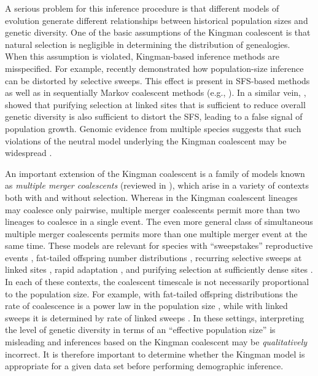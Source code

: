\documentclass[11pt, letterpaper]{article}   	%
\begin{document}
A serious problem for this inference procedure is that different models of evolution generate different relationships between historical population sizes and genetic diversity.
One of the basic assumptions of the Kingman coalescent is that natural selection is negligible in determining the distribution of genealogies.
When this assumption is violated, Kingman-based inference methods are misspecified.
For example, \cite{SchriderEtAl2016} recently demonstrated how population-size inference can be distorted by selective sweeps.
This effect is present in SFS-based methods as well as in sequentially Markov coalescent methods (e.g., \cite{LiDurbin2011}).
In a similar vein, \cite{CvijovicEtAl2018}, showed that purifying selection at linked sites that is sufficient to reduce overall genetic diversity is also sufficient to distort the SFS, leading to a false signal of population growth.
Genomic evidence from multiple species suggests that such violations of the neutral model underlying the Kingman coalescent may be widespread \autocite{SellaEtAl2009, Corbett-DetigEtAl2015, KernHahn2018}.

An important extension of the Kingman coalescent is a family of models known as \textit{multiple merger coalescents} \autocite{Pitman1999, Sagitov1999, DonnellyKurtz1999,} (reviewed in \cite{Eldon2016}), which arise in a variety of contexts both with and without selection.
Whereas in the Kingman coalescent lineages may coalesce only pairwise, multiple merger coalescents permit more than two lineages to coalesce in a single event.
The even more general class of simultaneous multiple merger coalescents \autocite{Schweinsberg2000, MohleSagitov2001, Sagitov2003} permits more than one multiple merger event at the same time.
These models are relevant for species with
``sweepstakes'' reproductive events \autocite{EldonWakeley2006, SargsyanWakeley2008},
fat-tailed offspring number distributions \autocite{Schweinsberg2003},
recurring selective sweeps at linked sites \autocite{DurrettSchweinsberg2005, CoopRalph},
rapid adaptation \autocite{NeherHallatscheck2013, DesaiEtAl},
and purifying selection at sufficiently dense sites \autocite{Seger, Good, Nicholaisen}.
In each of these contexts, the coalescent timescale is not necessarily proportional to the population size.
For example, with fat-tailed offspring distributions the rate of coalescence is a power law in the population size \autocite{Schweinsberg2003}, while with linked sweeps it is determined by rate of linked sweeps \autocite{DurrettSchweinsberg2005}.
In these settings, interpreting the level of genetic diversity in terms of an ``effective population size'' is misleading and inferences based on the Kingman coalescent may be \emph{qualitatively} incorrect.
It is therefore important to determine whether the Kingman model is appropriate for a given data set before performing demographic inference.
\end{document}
